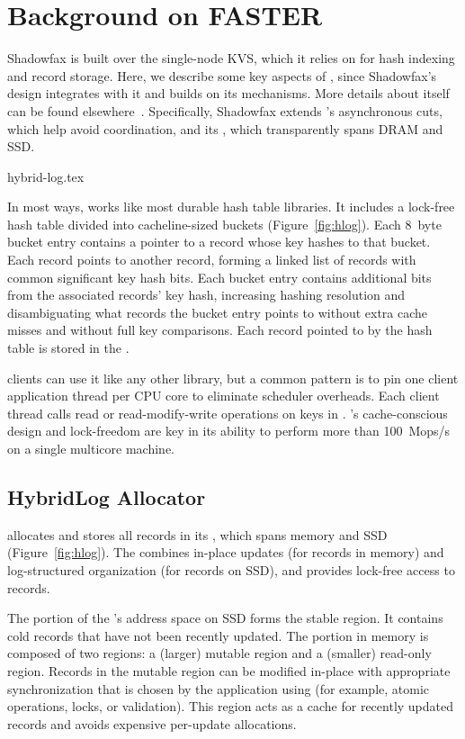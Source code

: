 \section{Background on FASTER}
\label{sec:fasterkv}

Shadowfax is built over the \faster single-node KVS, which it relies on for
hash indexing and record storage.
%
Here, we describe some key aspects of \faster, since Shadowfax's design
integrates with it and builds on its mechanisms.
%
More details about \faster itself can be found elsewhere~\cite{faster,cpr}.
%
Specifically, Shadowfax extends \faster's asynchronous
cuts, which help avoid coordination, and its \hlog, which transparently
spans DRAM and SSD.

 {hybrid-log.tex}

In most ways, \faster works like most durable hash table libraries.
%
It includes a lock-free hash table divided into cacheline-sized buckets
(Figure~\ref{fig:hlog}).
%
Each 8~byte bucket entry contains a pointer to a record whose key hashes to
that bucket.
%
Each record points to another record, forming a linked list of records with
common significant key hash bits.
%
Each bucket entry contains additional bits from the associated records' key
hash, increasing hashing resolution and disambiguating what records the bucket
entry points to without extra cache misses and without full key comparisons.
%
Each record pointed to by the hash table is stored in the \hlog.

\faster clients can use it like any other library, but a common pattern is to
pin one client application thread per CPU core to eliminate scheduler overheads.
%
Each client thread calls read or read-modify-write operations on keys in
\faster.
%
\faster's cache-conscious design and lock-freedom are key in its ability to
perform more than 100~Mops/s on a single multicore machine.
%


\subsection{HybridLog Allocator}
\label{sec:hlog}

\faster allocates and stores all records in its \hlog, which spans memory and
SSD (Figure~\ref{fig:hlog}).
%
The \hlog combines in-place updates (for records in memory) and log-structured
organization (for records on SSD), and provides lock-free access to records.

The portion of the \hlog's address space on SSD forms the stable
region.
%
It contains cold records that have not been recently updated.
%
The portion in memory is composed of two regions: a (larger) mutable region and a
(smaller) read-only region.
%
Records in the mutable region can be modified in-place with appropriate
synchronization that is chosen by the application using \faster (for example, atomic
operations, locks, or validation).
%
This region acts as a cache for recently updated records and avoids expensive
per-update allocations.


